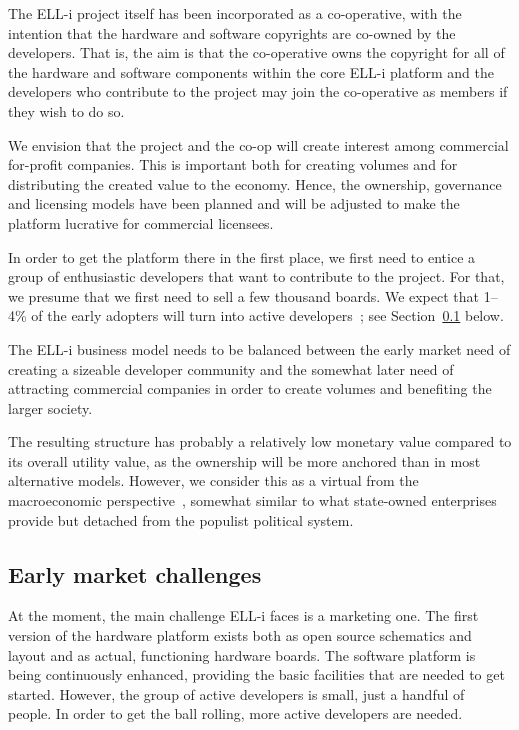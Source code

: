 \documentclass{siamltex}
\begin{document}
The ELL-i project itself has been incorporated as a co-operative, with
the intention that the hardware and software copyrights are co-owned
by the developers.  That is, the aim is that the co-operative owns the
copyright for all of the hardware and software components within the
core ELL-i platform and the developers who contribute to the project
may join the co-operative as members if they wish to do so.

We envision that the project and the co-op will create interest among
commercial for-profit companies.  This is important both for creating
volumes and for distributing the created value to the economy.
Hence, the ownership, governance and licensing models have been
planned and will be adjusted to make the platform lucrative for
commercial licensees.

In order to get the platform there in the first place, we
first need to entice a group of enthusiastic developers that want to
contribute to the project.  For that, we presume that we first need to
sell a few thousand boards.  
We expect that 1--4\% of the early
adopters will turn into active developers~\cite{anderson2012makers}; see
Section~\ref{ssec:earlymarket} below.

The ELL-i business model needs to be balanced between the early
market need of creating a sizeable developer community and the
somewhat later need of attracting commercial companies in order to
create volumes and benefiting the larger society.  

The resulting structure has probably a relatively low monetary value
compared to its overall utility value, as the ownership will be more
anchored than in most alternative models. However, we consider this
as a virtual from the macroeconomic
perspective~\cite{Olson2002}, somewhat similar to what
state-owned enterprises provide but detached from the populist
political system.

\subsection{Early market challenges}
\label{ssec:earlymarket}

At the moment, the main challenge ELL-i faces is a marketing one.  The
first version of the hardware platform exists both as open source
schematics and layout and as actual, functioning hardware boards.  The
software platform is being continuously enhanced, providing the basic
facilities that are needed to get started.  However, the group of
active developers is small, just a handful of people.  
In order to get the ball rolling, more
active developers are needed.
\end{document}
